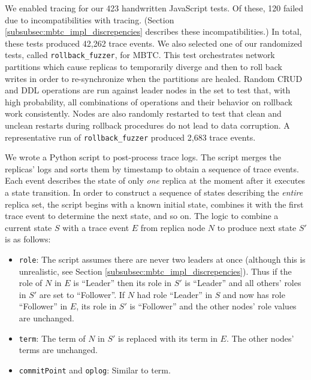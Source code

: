 \documentclass{vldb}
\begin{document}
We enabled tracing for our 423 handwritten JavaScript tests. 
Of these, 120 failed due to incompatibilities with tracing. 
(Section \ref{subsubsec:mbtc_impl_discrepencies} describes these incompatibilities.)
In total, these tests produced 42,262 trace events. 
We also selected one of our randomized tests, called \texttt{rollback\_fuzzer}, for MBTC. 
This test orchestrates network partitions which cause replicas to temporarily diverge and then to roll back writes in order to re-synchronize when the partitions are healed.
Random CRUD and DDL operations are run against leader nodes in the set to test that, with high probability, all combinations of operations and their behavior on rollback work consistently.
Nodes are also randomly restarted to test that clean and unclean restarts during rollback procedures do not lead to data corruption.
A representative run of \texttt{rollback\_fuzzer} produced 2,683 trace events.

We wrote a Python script \cite{ReplTraceChecker} to post-process trace logs. 
The script merges the replicas' logs and sorts them by timestamp to obtain a sequence of trace events. 
Each event describes the state of only \textit{one} replica at the moment after it executes a state transition.
In order to construct a sequence of states describing the \textit{entire} replica set, the script begins with a known initial state, combines it with the first trace event to determine the next state, and so on. 
The logic to combine a current state $S$ with a trace event $E$ from replica node $N$ to produce next state $S'$ is as follows:

\begin{itemize}[itemsep=-0.5ex]
\item \texttt{role}: The script assumes there are never two leaders at once (although this is unrealistic, see Section \ref{subsubsec:mbtc_impl_discrepencies}). Thus if the role of $N$ in $E$ is ``Leader'' then its role in $S'$ is ``Leader'' and all others' roles in $S'$ are set to ``Follower''. If $N$ had role ``Leader'' in $S$ and now has role ``Follower'' in $E$, its role in $S'$ is ``Follower'' and the other nodes' role values are unchanged. 
\item \texttt{term}: The term of $N$ in $S'$ is replaced with its term in $E$. The other nodes' terms are unchanged.
\item \texttt{commitPoint} and \texttt{oplog}: Similar to term.
\end{itemize}
\end{document}

